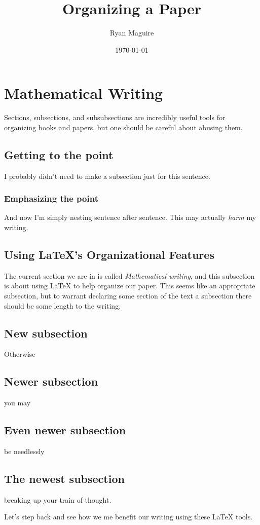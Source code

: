 \documentclass{article}
\title{Organizing a Paper}
\author{Ryan Maguire}
\date{\today}
\theoremstyle{normal}
\begin{document}
    \maketitle
    \tableofcontents
    \section{Mathematical Writing}
        Sections, subsections, and subsubsections are incredibly useful tools
        for organizing books and papers, but one should be careful about abusing
        them.
        \subsection{Getting to the point}
            I probably didn't need to make a subsection just for this sentence.
            \subsubsection{Emphasizing the point}
                And now I'm simply nesting sentence after sentence. This may
                actually \textit{harm} my writing.
        \subsection{Using \LaTeX{}'s Organizational Features}
            The current section we are in is called
            \textit{Mathematical writing}, and this subsection is about using
            \LaTeX{} to help organize our paper.
            This seems like an appropriate subsection, but to warrant declaring
            some section of the text a subsection there should be some length
            to the writing.
        \subsection{New subsection}
            Otherwise
        \subsection{Newer subsection}
            you may
        \subsection{Even newer subsection}
            be needlessly
        \subsection{The newest subsection}
            breaking up your train of thought.
            \par\hfill\par
            Let's step back and see how we me benefit our writing using these
            \LaTeX{} tools.
\end{document}
